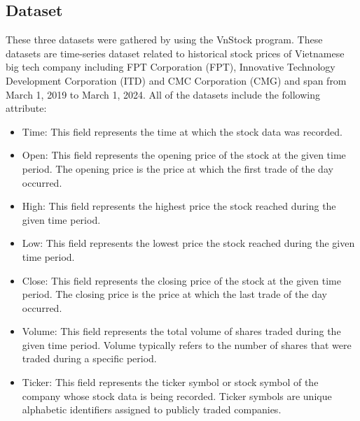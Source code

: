 \documentclass{ieeeojies}
\begin{document}
\subsection{Dataset}
These three datasets were gathered by using the VnStock program. These datasets are time-series dataset related to historical stock prices of Vietnamese big tech company including FPT Corporation (FPT), Innovative Technology Development Corporation (ITD) and CMC Corporation (CMG) and span from March 1, 2019 to March 1, 2024. All of the datasets include the following attribute:
\begin{itemize}
    \item Time: This field represents the time at which the stock data was recorded.
    \item Open: This field represents the opening price of the stock at the given time period. The opening price is the price at which the first trade of the day occurred.
    \item High: This field represents the highest price the stock reached during the given time period.
    \item Low: This field represents the lowest price the stock reached during the given time period.
    \item Close: This field represents the closing price of the stock at the given time period. The closing price is the price at which the last trade of the day occurred.
    \item Volume: This field represents the total volume of shares traded during the given time period. Volume typically refers to the number of shares that were traded during a specific period.
    \item Ticker: This field represents the ticker symbol or stock symbol of the company whose stock data is being recorded. Ticker symbols are unique alphabetic identifiers assigned to publicly traded companies.
\end{itemize}
\end{document}
